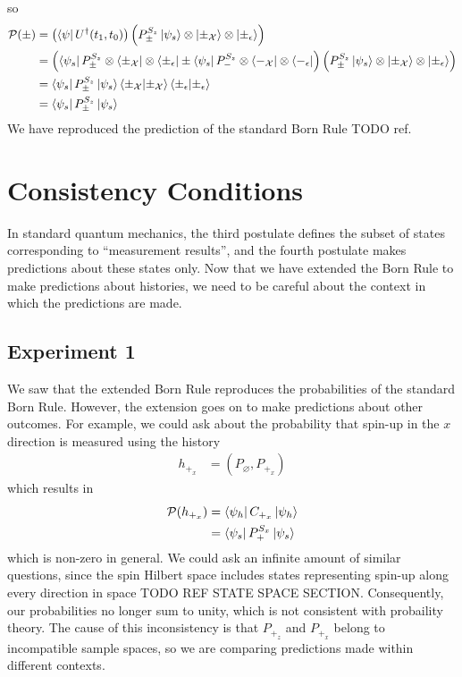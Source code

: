 so
\begin{align}
  \mathcal{P}(\pm) &= \left(\bra{\psi}  U^\dagger(t_1, t_0)\right) \left( P^{S_z}_\pm \ket{\psi_s} \otimes \ket{\pm_\mathcal{X}} \otimes \ket{\pm_\epsilon}\right) \\ \nonumber
   &= \left(\bra{\psi_s}P^{S_z}_\pm \otimes \bra{\pm_\mathcal{X}} \otimes \bra{\pm_\epsilon} \pm \bra{\psi_s}P^{S_z}_- \otimes \bra{-_\mathcal{X}} \otimes \bra{-_\epsilon} \right) \left( P^{S_z}_\pm \ket{\psi_s} \otimes \ket{\pm_\mathcal{X}} \otimes \ket{\pm_\epsilon}\right) \\ \nonumber
   &= \bra{\psi_s} P^{S_z}_\pm \ket{\psi_s} \braket{\pm_\mathcal{X}|\pm_\mathcal{X}} \braket{\pm_\epsilon|\pm_\epsilon} \\ \nonumber
   &= \bra{\psi_s} P^{S_z}_\pm \ket{\psi_s}
\end{align}
We have reproduced the prediction of the standard Born Rule TODO ref.

\section{Consistency Conditions}

In standard quantum mechanics, the third postulate defines the subset of states corresponding to ``measurement results'', and the fourth postulate makes predictions about these states only. Now that we have extended the Born Rule to make predictions about histories, we need to be careful about the context in which the predictions are made.

\subsection{Experiment 1}

We saw that the extended Born Rule reproduces the probabilities of the standard Born Rule. However, the extension goes on to make predictions about other outcomes. For example, we could ask about the probability that spin-up in the $x$ direction is measured using the history
\begin{align}
  h_{+_x} &= (P_\varnothing ,P_{+_x} )
\end{align}
which results in
\begin{align}
  \mathcal{P}(h_{+_x}) &= \bra{\psi_h} C_{+_x} \ket{\psi_h}  \\ \nonumber
  &= \bra{\psi_s} P^{S_x}_+ \ket{\psi_s}
\end{align}
which is non-zero in general. We could ask an infinite amount of similar questions, since the spin Hilbert space includes states representing spin-up along every direction in space TODO REF STATE SPACE SECTION. Consequently, our probabilities no longer sum to unity, which is not consistent with probaility theory. The cause of this inconsistency is that $P_{+_z}$ and $P_{+_x}$ belong to incompatible sample spaces, so we are comparing predictions made within different contexts.

